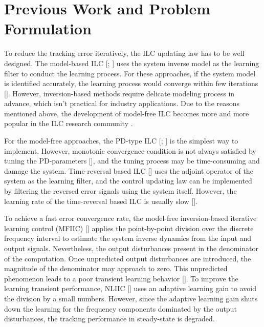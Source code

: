 \documentclass[a4paper, 12pt, twoside, openright]{mythesis}
\begin{document}
\section{Previous Work and Problem Formulation}
\label{sec:Previous Work and Problem Formulation}

To reduce the tracking error iteratively, the ILC updating law has to be well designed. The model-based ILC [\cite{lee1994feedback}; \cite{harte2005discrete}] uses the system inverse model as the learning filter to conduct the learning process. For these approaches, if the system model is identified accurately, the learning process would converge within few iterations [\cite{teng2015comparison}]. However, inversion-based methods require delicate modeling process in advance, which isn't practical for industry applications. Due to the reasons mentioned above, the development of model-free ILC becomes more and more popular in the ILC research community \cite{janssens2011model}.

For the model-free approaches, the PD-type ILC [\cite{arimoto1984bettering}; \cite{chen2006pd}] is the simplest way to implement. However, monotonic convergence condition is not always satisfied by tuning the PD-parameters [\cite{moore2005monotonically}], and the tuning process may be time-consuming and damage the system. Time-reversal based ILC [\cite{ye2005zero}] uses the adjoint operator of the system as the learning filter, and the control updating law can be implemented by filtering the reversed error signals using the system itself. However, the learning rate of the time-reversal based ILC is usually slow [\cite{chen2017data}].  

To achieve a fast error convergence rate, the model-free inversion-based iterative learning control (MFIIC) [\cite{kim2012modeling}] applies the point-by-point division over the discrete frequency interval to estimate the system inverse dynamics from the input and output signals. Nevertheless, the output disturbances present in the denominator of the computation. Once unpredicted output disturbances are introduced, the magnitude of the denominator may approach to zero. This unpredicted phenomenon leads to a poor transient learning behavior [\cite{de2018improving}]. To improve the learning transient performance, NLIIC [\cite{de2019data}] uses an adaptive learning gain to avoid the division by a small numbers. However, since the adaptive learning gain shuts down the learning for the frequency components dominated by the output disturbances, the tracking performance in steady-state is degraded.      
\end{document}
